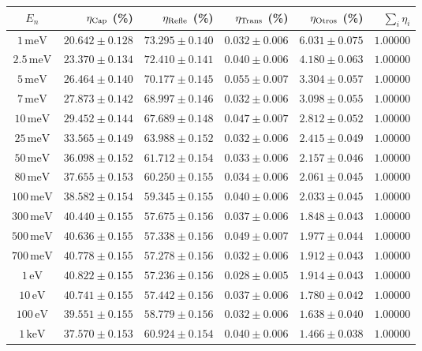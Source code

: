 \begin{tabular}{crrrrr}
\toprule
$E_n$ & $\eta_{\rm Cap}$ (\%) & $\eta_{\rm Refle}$ (\%) & $\eta_{\rm Trans}$ (\%) & $\eta_{\rm Otros}$ (\%) & $\sum_i \eta_i$ \\
\midrule
$1\,\mathrm{meV}$ & $20.642\pm0.128$ & $73.295\pm0.140$ & $0.032\pm0.006$ & $6.031\pm0.075$ & $1.00000$ \\
$2.5\,\mathrm{meV}$ & $23.370\pm0.134$ & $72.410\pm0.141$ & $0.040\pm0.006$ & $4.180\pm0.063$ & $1.00000$ \\
$5\,\mathrm{meV}$ & $26.464\pm0.140$ & $70.177\pm0.145$ & $0.055\pm0.007$ & $3.304\pm0.057$ & $1.00000$ \\
$7\,\mathrm{meV}$ & $27.873\pm0.142$ & $68.997\pm0.146$ & $0.032\pm0.006$ & $3.098\pm0.055$ & $1.00000$ \\
$10\,\mathrm{meV}$ & $29.452\pm0.144$ & $67.689\pm0.148$ & $0.047\pm0.007$ & $2.812\pm0.052$ & $1.00000$ \\
$25\,\mathrm{meV}$ & $33.565\pm0.149$ & $63.988\pm0.152$ & $0.032\pm0.006$ & $2.415\pm0.049$ & $1.00000$ \\
$50\,\mathrm{meV}$ & $36.098\pm0.152$ & $61.712\pm0.154$ & $0.033\pm0.006$ & $2.157\pm0.046$ & $1.00000$ \\
$80\,\mathrm{meV}$ & $37.655\pm0.153$ & $60.250\pm0.155$ & $0.034\pm0.006$ & $2.061\pm0.045$ & $1.00000$ \\
$100\,\mathrm{meV}$ & $38.582\pm0.154$ & $59.345\pm0.155$ & $0.040\pm0.006$ & $2.033\pm0.045$ & $1.00000$ \\
$300\,\mathrm{meV}$ & $40.440\pm0.155$ & $57.675\pm0.156$ & $0.037\pm0.006$ & $1.848\pm0.043$ & $1.00000$ \\
$500\,\mathrm{meV}$ & $40.636\pm0.155$ & $57.338\pm0.156$ & $0.049\pm0.007$ & $1.977\pm0.044$ & $1.00000$ \\
$700\,\mathrm{meV}$ & $40.778\pm0.155$ & $57.278\pm0.156$ & $0.032\pm0.006$ & $1.912\pm0.043$ & $1.00000$ \\
$1\,\mathrm{eV}$ & $40.822\pm0.155$ & $57.236\pm0.156$ & $0.028\pm0.005$ & $1.914\pm0.043$ & $1.00000$ \\
$10\,\mathrm{eV}$ & $40.741\pm0.155$ & $57.442\pm0.156$ & $0.037\pm0.006$ & $1.780\pm0.042$ & $1.00000$ \\
$100\,\mathrm{eV}$ & $39.551\pm0.155$ & $58.779\pm0.156$ & $0.032\pm0.006$ & $1.638\pm0.040$ & $1.00000$ \\
$1\,\mathrm{keV}$ & $37.570\pm0.153$ & $60.924\pm0.154$ & $0.040\pm0.006$ & $1.466\pm0.038$ & $1.00000$ \\

\end{tabular}
